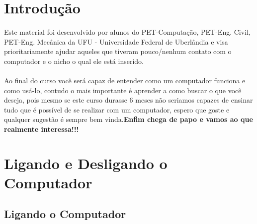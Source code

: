 \documentclass[hidelinks,12pt]{article}
\begin{document}
\pagestyle{fancy}
	
\tableofcontents
{\let\thefootnote\relax{}}

{\let\thefootnote\relax{}}

\newpage

\section{Introdução}
\paragraph{} Este material foi desenvolvido por alunos do PET-Computação, PET-Eng. Civil, PET-Eng. Mecânica da UFU - Universidade Federal de Uberlândia e visa
			prioritariamente ajudar aqueles que tiveram pouco/nenhum contato com o computador e o nicho o qual ele
			está inserido.
\paragraph{} Ao final do curso você será capaz de entender como um computador funciona e como usá-lo, contudo o mais importante
			é aprender a como buscar o que você deseja, pois mesmo se este curso durasse 6 meses não seriamos capazes 
			de ensinar tudo que é possível de se realizar com um computador, espero que goste e qualquer sugestão é sempre bem vinda.\textbf{Enfim chega de papo e vamos ao que realmente interessa!!!}

\section{Ligando e Desligando o Computador}
\subsection{Ligando o Computador} 
\end{document}
